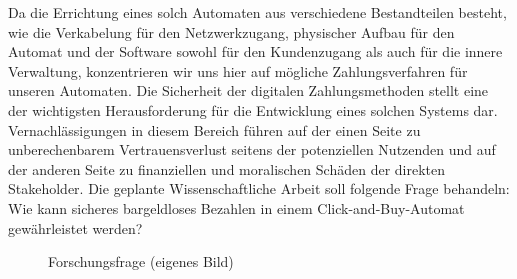 Da die Errichtung eines solch Automaten aus verschiedene Bestandteilen besteht, wie die Verkabelung für den Netzwerkzugang,
physischer Aufbau für den Automat und der Software sowohl für den Kundenzugang als auch für die innere Verwaltung,
konzentrieren wir uns hier auf mögliche Zahlungsverfahren für unseren Automaten. Die Sicherheit der digitalen 
Zahlungsmethoden stellt eine der wichtigsten Herausforderung für die Entwicklung eines solchen Systems dar. 
Vernachlässigungen in diesem Bereich führen auf der einen Seite zu unberechenbarem Vertrauensverlust seitens der potenziellen 
Nutzenden und auf der anderen Seite zu finanziellen und moralischen Schäden der direkten Stakeholder. Die geplante 
Wissenschaftliche Arbeit soll folgende Frage behandeln: Wie kann sicheres bargeldloses Bezahlen 
in einem Click-and-Buy-Automat gewährleistet werden? 

\vspace*{1cm}
\begin{figure}[H]
    \caption{Forschungsfrage (eigenes Bild)}
    \label{fig:diagramrecherche}
\end{figure}